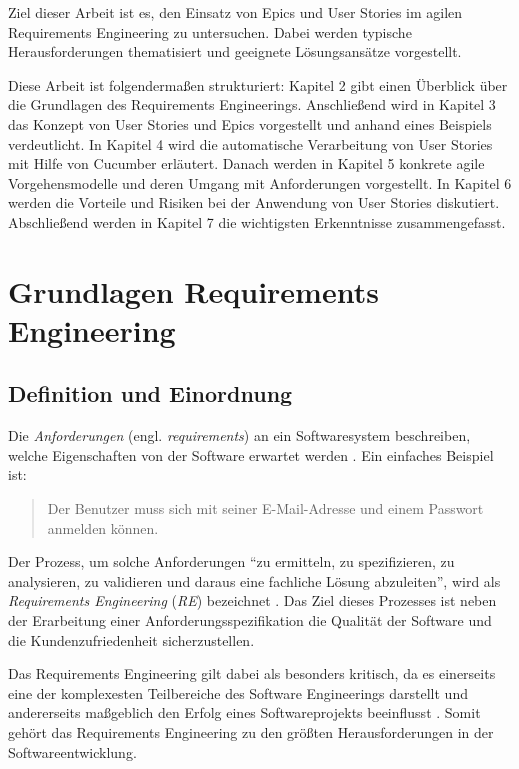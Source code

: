 \documentclass[acmtog]{acmart}
\begin{document}
Ziel dieser Arbeit ist es, den Einsatz von Epics und User Stories im agilen Requirements Engineering zu untersuchen. Dabei werden typische Herausforderungen thematisiert und geeignete Lösungsansätze vorgestellt.

Diese Arbeit ist folgendermaßen strukturiert:
Kapitel 2 gibt einen Überblick über die Grundlagen des Requirements Engineerings.
Anschließend wird in Kapitel 3 das Konzept von User Stories und Epics vorgestellt und anhand eines Beispiels verdeutlicht.
In Kapitel 4 wird die automatische Verarbeitung von User Stories mit Hilfe von Cucumber erläutert.
Danach werden in Kapitel 5 konkrete agile Vorgehensmodelle und deren Umgang mit Anforderungen vorgestellt.
In Kapitel 6 werden die Vorteile und Risiken bei der Anwendung von User Stories diskutiert.
Abschließend werden in Kapitel 7 die wichtigsten Erkenntnisse zusammengefasst.

\section{Grundlagen Requirements Engineering}

\subsection{Definition und Einordnung}
Die \emph{Anforderungen} (engl. \textit{requirements}) an ein Softwaresystem beschreiben, welche Eigenschaften von der Software erwartet werden \cite{sommerville16}.
Ein einfaches Beispiel ist:
\begin{quote}
Der Benutzer muss sich mit seiner E-Mail-Adresse und einem Passwort anmelden können.
\end{quote}

Der Prozess, um solche Anforderungen ``zu ermitteln, zu spezifizieren, zu analysieren, zu validieren und daraus eine fachliche Lösung abzuleiten'', wird als \emph{Requirements Engineering} (\emph{RE}) bezeichnet \cite{balzert09}.
Das Ziel dieses Prozesses ist neben der Erarbeitung einer Anforderungsspezifikation die Qualität der Software und die Kundenzufriedenheit sicherzustellen.

Das Requirements Engineering gilt dabei als besonders kritisch, da es einerseits eine der komplexesten Teilbereiche des Software Engineerings darstellt und andererseits maßgeblich den Erfolg eines Softwareprojekts beeinflusst \cite{balzert09}.
Somit gehört das Requirements Engineering zu den größten Herausforderungen in der Softwareentwicklung.
\end{document}

